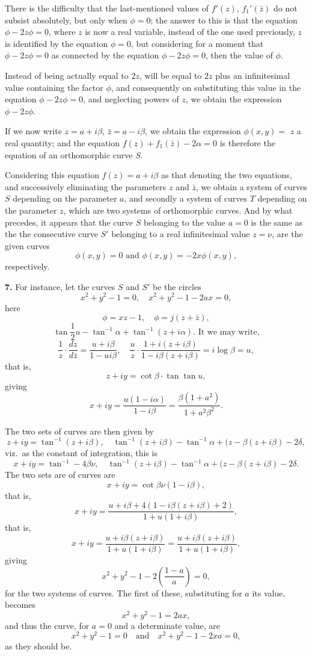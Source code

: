 \documentclass[11pt,a4paper]{article}
\begin{document}
There is the difficulty that the last-mentioned values of $f'(z)$, $f_1'(\bar{z})$ do not subsist absolutely, but only when $\phi = 0$; the answer to this is that the equation $\phi - 2 z \phi = 0$, where $z$ is now a real variable, instead of the one used previously, $z$ is identified by the equation $\phi = 0$, but considering for a moment that $\phi - 2 z \phi = 0$ as connected by the equation $\phi - 2 z \phi = 0$, then the value of $\phi$.

Instead of being actually equal to $2z$, will be equal to $2z$ plus an infinitesimal value containing the factor $\phi$, and consequently on substituting this value in the equation $\phi - 2 z \phi = 0$, and neglecting powers of $z$, we obtain the expression $\phi - 2 z \phi$.

If we now write $z = a + i \beta$, $\bar{z} = a - i \beta$, we obtain the expression $\phi(x, y) = $ $z$ a real quantity; and the equation $f(z) + f_1(\bar{z}) - 2 \alpha = 0$ is therefore the equation of an orthomorphic curve $S$.

Considering this equation $f(z) = a + i \beta$ as that denoting the two equations, and successively eliminating the parameters $z$ and $\bar{z}$, we obtain a system of curves $S$ depending on the parameter $a$, and secondly a system of curves $T$ depending on the parameter $z$, which are two systems of orthomorphic curves. And by what precedes, it appears that the curve $S$ belonging to the value $a = 0$ is the same as the
the consecutive curve $S'$ belonging to a real infinitesimal value $z = \nu$, are the given curves
\[
\phi(x, y) = 0 \text{ and } \phi(x, y) = - 2x\phi(x, y),
\]
respectively.

\textbf{7.} For instance, let the curves $S$ and $S'$ be the circles
\[
x^2 + y^2 - 1 = 0, \quad x^2 + y^2 - 1 - 2a x = 0,
\]
here
\[
\phi = x z - 1, \quad \phi = j (z + \bar{z}),
\]
\[
\tan \frac{1}{2}u - \tan^{-1} \alpha + \tan^{-1}(z + i \alpha). \text{ It we may write,}
\]
\[
\frac{1}{z} \cdot \frac{dz}{d\bar{z}} = \frac{u + i \beta}{1 - u i \beta}, \quad \frac{u}{z} \cdot \frac{1 + i (z + i \beta)}{1 - i \beta(z + i \beta)} = i \log \beta = u,
\]
that is,
\[
z + iy = \cot \beta \cdot \tan \tan u,
\]
giving
\[
x + iy = \frac{u(1 - i \alpha)}{1 - i \beta} = \frac{\beta(1 + a^2)}{1 + a^2 \beta^2}.
\]

The two sets of curves are then given by
\[
z + iy = \tan^{-1}(z + i \beta), \quad \tan^{-1}(z + i \beta) - \tan^{-1} \alpha + (z - \beta(z + i \beta) - 2\delta,
\]
viz.\ as the constant of integration, this is
\[
x + iy = \tan^{-1} - 4\beta\nu, \quad \tan^{-1}(z + i \beta) - \tan^{-1} \alpha + (z - \beta(z + i \beta) - 2\delta.
\]
The two sets are of curves are
\[
x + iy = \cot \beta\nu(1 - i\beta),
\]
that is,
\[
x + iy = \frac{u + i\beta + 4(1 - i\beta(z + i\beta) + 2)}{1 + u (1 + i\beta)},
\]
that is,
\[
x + iy = \frac{u + i\beta(z + i\beta)}{1 + u(1 + i\beta)} = \frac{u + i\beta(z + i\beta)}{1 + u(1 + i\beta)},
\]
giving
\[
x^2 + y^2 - 1 - 2 \left(\frac{1 - a}{a}\right) = 0,
\]
for the two systems of curves. The first of these, substituting for $a$ its value, becomes
\[
x^2 + y^2 - 1 = 2 a x,
\]
and thus the curve, for $a = 0$ and a determinate value, are
\[
x^2 + y^2 - 1 = 0 \quad \text{and} \quad x^2 + y^2 - 1 - 2x a = 0,
\]
as they should be.
\end{document}
